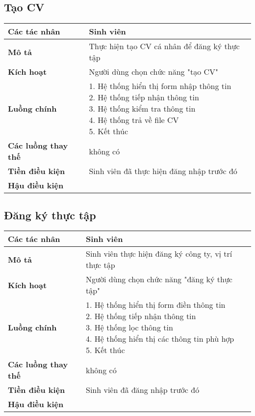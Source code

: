	\subsection*{Tạo CV}
	\begin{tabular}{|l|p{}|}
		\hline
		\textbf{Các tác nhân}         & Sinh viên                                             \\
		\hline
		\textbf{Mô tả}                & Thực hiện tạo CV cá nhân để đăng ký thực tập          \\
		\hline
		\textbf{Kích hoạt}            & Người dùng chọn chức năng "tạo CV"                    \\
		\hline
		\textbf{Luồng chính}           & \makecell[l]{1. Hệ thống hiển thị form nhập thông tin \\ 2. Hệ thống tiếp nhận thông tin \\ 3. Hệ thống kiểm tra thông tin \\ 4. Hệ thống trả về file CV \\ 5. Kết thúc} \\
		\hline
		\textbf{Các luồng thay thế}   & không có                                              \\
		\hline
		\textbf{Tiền điều kiện}       & Sinh viên đã thực hiện đăng nhập trước đó             \\
		\hline
		\textbf{Hậu điều kiện}        &                                                       \\
		\hline
	\end{tabular}

	\subsection*{Đăng ký thực tập}
	\begin{tabular}{|l|p{}|}
		\hline
		\textbf{Các tác nhân}         & Sinh viên                                             \\
		\hline
		\textbf{Mô tả}                & Sinh viên thực hiện đăng ký công ty, vị trí thực tập  \\
		\hline
		\textbf{Kích hoạt}            & Người dùng chọn chức năng "đăng ký thực tập"          \\
		\hline
		\textbf{Luồng chính}           & \makecell[l]{1. Hệ thống hiển thị form điền thông tin \\ 2. Hệ thống tiếp nhận thông tin \\ 3. Hệ thống lọc thông tin \\ 4. Hệ thống hiển thị các thông tin phù hợp \\ 5. Kết thúc} \\
		\hline
		\textbf{Các luồng thay thế}   & không có                                              \\
		\hline
		\textbf{Tiền điều kiện}       & Sinh viên đã đăng nhập trước đó                       \\
		\hline
		\textbf{Hậu điều kiện}        &                                                       \\
		\hline
	\end{tabular}
